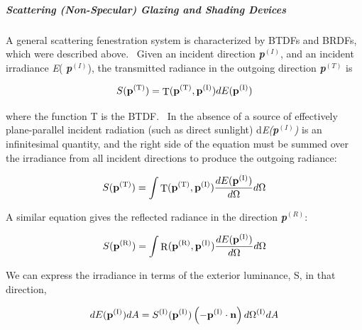 \subparagraph{\texorpdfstring{\textbf{Scattering (Non-Specular) Glazing and Shading Devices}}{Scattering (Non-Specular) Glazing and Shading Devices}}\label{scattering-non-specular-glazing-and-shading-devices}

A general scattering fenestration system is characterized by BTDFs and BRDFs, which were described above.~ Given an incident direction \textbf{\emph{p}}\(^{(I)}\), and an incident irradiance \emph{E}( \textbf{\emph{p}}\(^{(I)}\)), the transmitted radiance in the outgoing direction \textbf{\emph{p}}\(^{(T)}\) is

\begin{equation}
S({{\bf{p}}^{{\rm{(T)}}}}) = {\mathop{\rm T}\nolimits} ({{\bf{p}}^{{\rm{(T)}}}},{{\bf{p}}^{{\rm{(I)}}}})dE({{\bf{p}}^{{\rm{(I)}}}})
\end{equation}

where the function T is the BTDF.~ In the absence of a source of effectively plane-parallel incident radiation (such as direct sunlight) d\emph{E(\textbf{p}}\(^{(I)}\)\emph{)} is an infinitesimal quantity, and the right side of the equation must be summed over the irradiance from all incident directions to produce the outgoing radiance:

\begin{equation}
S({{\bf{p}}^{{\rm{(T)}}}}) = \int {{\mathop{\rm T}\nolimits} ({{\bf{p}}^{{\rm{(T)}}}},{{\bf{p}}^{{\rm{(I)}}}})\frac{{dE({{\bf{p}}^{{\rm{(I)}}}})}}{{d\Omega }}d\Omega }
\end{equation}

A similar equation gives the reflected radiance in the direction \textbf{\emph{p}}\(^{(R)}\):

\begin{equation}
S({{\bf{p}}^{{\rm{(R)}}}}) = \int {{\mathop{\rm R}\nolimits} ({{\bf{p}}^{{\rm{(R)}}}},{{\bf{p}}^{{\rm{(I)}}}})\frac{{dE({{\bf{p}}^{{\rm{(I)}}}})}}{{d\Omega }}d\Omega }
\end{equation}

We can express the irradiance in terms of the exterior luminance, S, in that direction,

\begin{equation}
dE({{\bf{p}}^{{\rm{(I)}}}})dA = {S^{{\rm{(I)}}}}({{\bf{p}}^{{\rm{(I)}}}})\left( { - {{\bf{p}}^{{\rm{(I)}}}}\cdot {\bf{n}}} \right)d{\Omega ^{{\rm{(I)}}}}dA
\end{equation}

